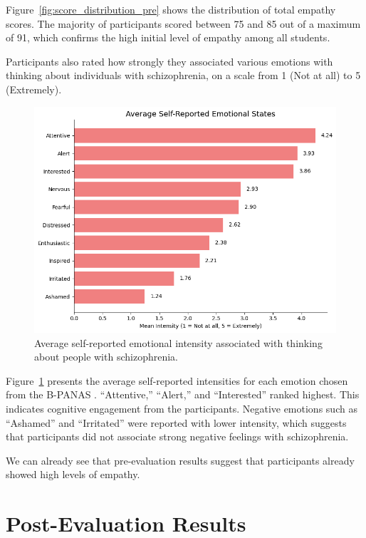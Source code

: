 \vspace{1em}

Figure~\ref{fig:score_distribution_pre} shows the distribution of total empathy scores. The majority of participants scored between 75 and 85 out of a maximum of 91, which confirms the high initial level of empathy among all students. 

\vspace{1em}

Participants also rated how strongly they associated various emotions with thinking about individuals with schizophrenia, on a scale from 1 (Not at all) to 5 (Extremely).

\begin{figure}[htbp]
    \centering
    \includegraphics[width=0.7\columnwidth]{../../Figures/avg-emotions-pre.png}
    \caption{Average self-reported emotional intensity associated with thinking about people with schizophrenia.}
    \label{fig:avg_emotions_pre}
\end{figure}

Figure~\ref{fig:avg_emotions_pre} presents the average self-reported intensities for each emotion chosen from the B-PANAS \cite{Boiroux2024}. “Attentive,” “Alert,” and “Interested” ranked highest. This indicates cognitive engagement from the participants. Negative emotions such as “Ashamed” and “Irritated” were reported with lower intensity, which suggests that participants did not associate strong negative feelings with schizophrenia. 

\vspace{1em}

We can already see that pre-evaluation results suggest that participants already showed high levels of empathy. 

\section{Post-Evaluation Results}


